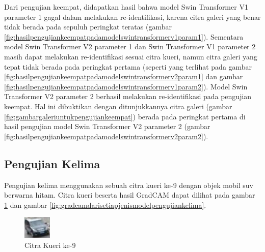 Dari pengujian keempat, didapatkan hasil bahwa model Swin Transformer V1 \linebreak parameter 1 gagal dalam melakukan re-identifikasi, 
karena citra galeri yang benar tidak berada pada sepuluh peringkat teratas (gambar 
\ref{fig:hasilpengujiankeempatpadamodelswintransformerv1param1}). Sementara model Swin Transformer V2 parameter 1 dan 
Swin Transformer V1 parameter 2 masih dapat melakukan re-identifikasi sesuai citra kueri, namun citra galeri yang tepat 
tidak berada pada peringkat pertama (seperti yang terlihat pada gambar \ref{fig:hasilpengujiankeempatpadamodelswintransformerv2param1} 
dan gambar \ref{fig:hasilpengujiankeempatpadamodelswintransformerv1param2}). Model Swin Transformer V2 parameter 2 berhasil 
melakukan re-identifikasi pada pengujian keempat. Hal ini dibuktikan dengan ditunjukkannya citra galeri 
(gambar \ref{fig:gambargaleriuntukpengujiankeempat}) berada pada peringkat pertama di hasil pengujian model Swin Transformer 
V2 parameter 2 (gambar \ref{fig:hasilpengujiankeempatpadamodelswintransformerv2param2}).\\

\subsection{Pengujian Kelima}

Pengujian kelima menggunakan sebuah citra kueri ke-9 dengan objek mobil suv berwarna hitam. Citra kueri 
beserta hasil GradCAM dapat dilihat pada gambar \ref{fig:gambarkueriuntukpengujiankelima} dan gambar 
\ref{fig:gradcamdarisetiapjenismodelpengujiankelima}.

\begin{figure}[h!]
  \centering
  \includegraphics[scale=2]{gambar/Que9_1019.jpg}
  \caption{Citra Kueri ke-9}
  \label{fig:gambarkueriuntukpengujiankelima}
\end{figure}

